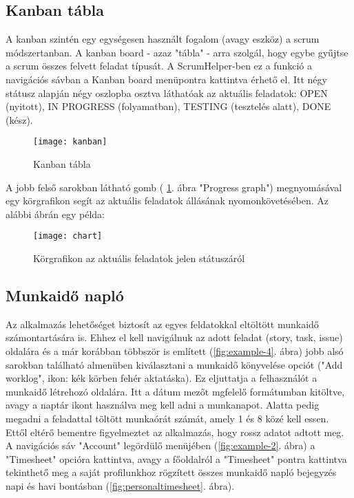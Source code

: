 \subsection{Kanban tábla}
\label{kanbanboard}

A kanban szintén egy egységesen használt fogalom (avagy eszköz) a scrum módszertanban. A kanban board - azaz "tábla" - arra szolgál, hogy egybe gyűjtse a scrum összes felvett feladat típusát. A ScrumHelper-ben ez a funkció a navigációs sávban a Kanban board menüpontra kattintva érhető el. Itt négy státusz alapján négy oszlopba osztva láthatóak az aktuális feladatok: OPEN (nyitott), IN PROGRESS (folyamatban), TESTING (tesztelés alatt), DONE (kész).

\begin{figure}[H]
	\centering
	\texttt{[image: kanban]}
	\caption{Kanban tábla}
	\label{fig:kanban}
\end{figure}

A jobb felső sarokban látható gomb ( \ref{fig:kanban}. ábra "Progress graph") megnyomásával egy körgrafikon segít az aktuális feladatok állásának nyomonkövetésében. Az alábbi ábrán egy példa:

\begin{figure}[H]
	\centering
	\texttt{[image: chart]}
	\caption{Körgrafikon az aktuális feladatok jelen státuszáról}
	\label{fig:kanbanchart}
\end{figure}

\pagebreak

\subsection{Munkaidő napló}
\label{worklog}

Az alkalmazás lehetőséget biztosít az egyes feldatokkal eltöltött munkaidő számontartására is. Ehhez el kell navigálnuk az adott feladat (story, task, issue) oldalára és a már korábban többször is említett (\ref{fig:example-4}. ábra) jobb alsó sarokban található almenüben kiválasztani a munkaidő könyvelése opciót ("Add worklog", ikon: kék körben fehér aktatáska). Ez eljuttatja a felhasználót a munkaidő létrehozó oldalára. Itt a dátum mezőt mgfelelő formátumban kitöltve, avagy a naptár ikont használva meg kell adni a munkanapot. Alatta pedig megadni a feladattal töltött munkaórát számát, amely 1 és 8 közé kell essen. Ettől eltérő bementre figyelmeztet az alkalmazás, hogy rossz adatot adtott meg. A navigációs sáv "Account" legördülő menüjében (\ref{fig:example-2}. ábra) a "Timesheet" opcióra kattintva, avagy a főoldalról a "Timesheet" pontra kattintva tekinthető meg a saját profilunkhoz rögzített összes munkaidő napló bejegyzés napi és havi bontásban (\ref{fig:personaltimesheet}. ábra).

